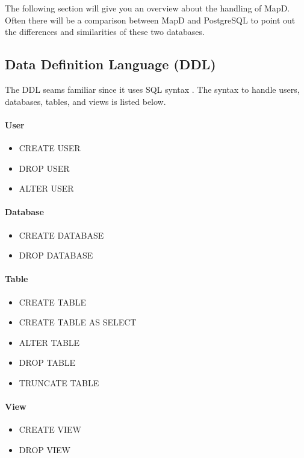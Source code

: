 The following section will give you an overview about the handling of MapD.
Often there will be a comparison between MapD and PostgreSQL to point out the differences and similarities of these two databases.



\subsection{Data Definition Language (DDL)}
The DDL seams familiar since it uses SQL syntax \cite{ddl}.
The syntax to handle users, databases, tables, and views is listed below.

\paragraph{User}
\begin{itemize}
 \item CREATE USER
 \item DROP USER
 \item ALTER USER
\end{itemize}

\paragraph{Database}
\begin{itemize}
 \item CREATE DATABASE
 \item DROP DATABASE
\end{itemize}


\paragraph{Table}
\begin{itemize}
 \item CREATE TABLE
 \item CREATE TABLE AS SELECT
 \item ALTER TABLE
 \item DROP TABLE
 \item TRUNCATE TABLE
\end{itemize}

\paragraph{View}
\begin{itemize}
 \item CREATE VIEW
 \item DROP VIEW
\end{itemize}


